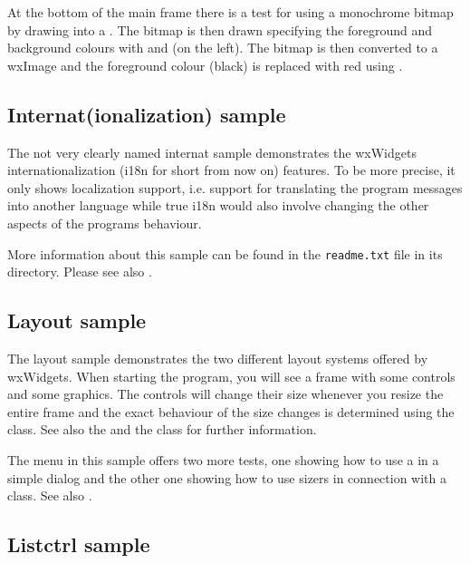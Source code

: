 At the bottom of the main frame there is a test for using a monochrome bitmap by
drawing into a . The bitmap is then drawn
specifying the foreground and background colours with
 and
 (on the left). The
bitmap is then converted to a wxImage and the foreground colour (black) is
replaced with red using .


\subsection{Internat(ionalization) sample}\label{sampleinternat}

The not very clearly named internat sample demonstrates the wxWidgets
internationalization (i18n for short from now on) features. To be more
precise, it only shows localization support, i.e. support for translating the
program messages into another language while true i18n would also involve
changing the other aspects of the programs behaviour.

More information about this sample can be found in the {\tt readme.txt} file in
its directory. Please see also .


\subsection{Layout sample}\label{samplelayout}

The layout sample demonstrates the two different layout systems offered
by wxWidgets. When starting the program, you will see a frame with some
controls and some graphics. The controls will change their size whenever
you resize the entire frame and the exact behaviour of the size changes
is determined using the 
class. See also the  and the
class for further information.

The menu in this sample offers two more tests, one showing how to use
a  in a simple dialog and the other one
showing how to use sizers in connection with a 
class. See also .


\subsection{Listctrl sample}\label{samplelistctrl}

